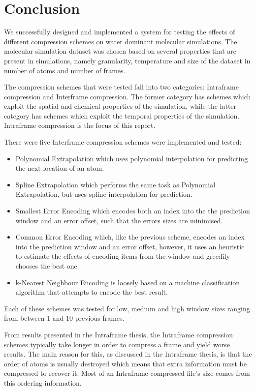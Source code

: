 \documentclass[a4paper,11pt]{report}
\begin{document}
\chapter{Conclusion}

We successfully designed and implemented a system for testing the effects of different compression schemes on water dominant molecular simulations. The molecular simulation dataset was chosen based on several properties that are present in simulations, namely granularity, temperature and size of the dataset in number of atoms and number of frames.

The compression schemes that were tested fall into two categories: Intraframe compression and Interframe compression. The former category has schemes which exploit the spatial and chemical properties of the simulation, while the latter category has schemes which exploit the temporal properties of the simulation. Intraframe compression is the focus of this report.

There were five Interframe compression schemes were implemented and tested:

\begin{itemize}
 \item Polynomial Extrapolation which uses polynomial interpolation for predicting the next location of an atom.
 \item Spline Extrapolation which performs the same task as Polynomial Extrapolation, but uses spline interpolation for prediction.
 \item Smallest Error Encoding which encodes both an index into the the prediction window and an error offset, such that the errors sizes are minimised.
 \item Common Error Encoding which, like the previous scheme, encodes an index into the prediction window and an error offset, however, it uses an heuristic to estimate the effects of encoding items from the window and greedily chooses the best one.
 \item k-Nearest Neighbour Encoding is loosely based on a machine classification algorithm that attempts to encode the best result. 
\end{itemize}

Each of these schemes was tested for low, medium and high window sizes ranging from between 1 and 10 previous frames. 

From results presented in the Intraframe thesis\cite{kegcomp}, the Intraframe compression schemes typically take longer in order to compress a frame and yield worse results. The main reason for this, as discussed in the Intraframe thesis, is that the order of atoms is usually destroyed which means that extra information must be compressed to recover it. Most of an Intraframe compressed file's size comes from this ordering information.
\end{document}
